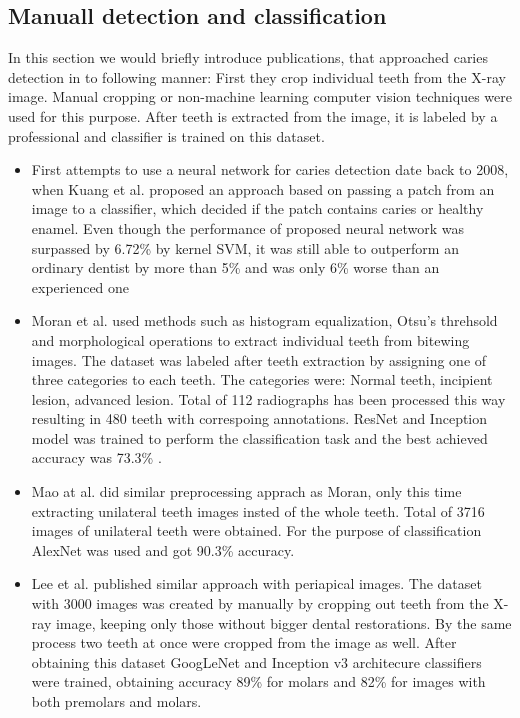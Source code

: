 \subsection{Manuall detection and classification}
In this section we would briefly introduce publications, that approached caries detection in to following manner: First they crop individual teeth from the X-ray image. Manual cropping or non-machine learning computer vision techniques were used for this purpose. After teeth is extracted from the image, it is labeled by a professional and classifier is trained on this dataset.
\begin{itemize}
    \item First attempts to use a neural network for caries detection date back to 2008, when Kuang et al. \cite{Kuang2008} proposed an approach based on passing a patch from an image to a classifier, which decided if the patch contains caries or healthy enamel. Even though the performance of proposed neural network was surpassed by 6.72\% by kernel SVM, it was still able to outperform an ordinary dentist by more than 5\% and was only 6\% worse than an experienced one
    \item Moran et al.\cite{Moran2021} used methods such as histogram equalization, Otsu's threhsold and morphological operations to extract individual teeth from bitewing images. The dataset was labeled after teeth extraction by assigning one of three categories to each teeth. The categories were: Normal teeth, incipient lesion, advanced lesion. Total of 112 radiographs has been processed this way resulting in 480 teeth with correspoing annotations. ResNet and Inception model was trained to perform the classification task and the best achieved accuracy was 73.3\% \cite{Moran2021}.
    \item{Mao at al. \cite{Mao2021}} did similar preprocessing apprach as Moran, only this time extracting unilateral teeth images insted of the whole teeth. Total of 3716 images of unilateral teeth were obtained. For the purpose of classification AlexNet was used and got 90.3\% accuracy.
    \item{Lee et al. \cite{Lee2018}} published similar approach with periapical images. The dataset with 3000 images was created by manually by cropping out teeth from the X-ray image, keeping only those without bigger dental restorations. By the same process two teeth at once were cropped from the image as well. After obtaining this dataset GoogLeNet and Inception v3 architecure classifiers were trained, obtaining accuracy 89\%  for molars and 82\% for images with both premolars and molars.
\end{itemize}


